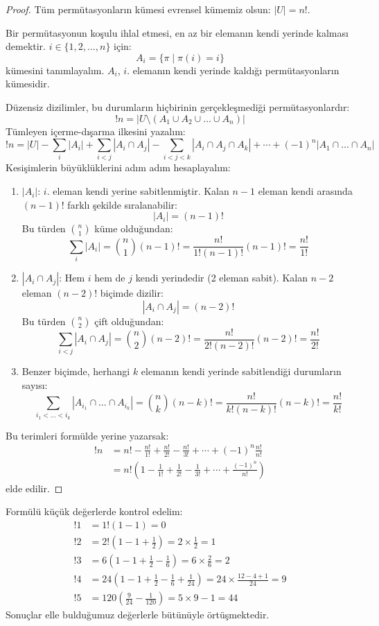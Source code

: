 \begin{proof} Tüm permütasyonların kümesi evrensel kümemiz olsun: $|U| = n!$.

Bir permütasyonun koşulu ihlal etmesi, en az bir elemanın kendi yerinde kalması
demektir. $i \in \{1, 2, \dots, n\}$ için: \[ A_i = \{ \pi \mid \pi(i) = i \} \]
kümesini tanımlayalım. $A_i$, $i$. elemanın kendi yerinde kaldığı permütasyonların
kümesidir.

Düzensiz dizilimler, bu durumların hiçbirinin gerçekleşmediği
permütasyonlardır: \[ !n = |U \setminus (A_1 \cup A_2 \cup \dots \cup A_n)| \]
Tümleyen içerme-dışarma ilkesini yazalım: \[ !n = |U| - \sum_{i} |A_i| + \sum_{i
< j} |A_i \cap A_j| - \sum_{i < j < k} |A_i \cap A_j \cap A_k| + \cdots + (-1)^n
|A_1 \cap \dots \cap A_n| \] Kesişimlerin büyüklüklerini adım adım hesaplayalım:
\begin{enumerate} \item $|A_i|$: $i$. eleman kendi yerine sabitlenmiştir. Kalan
$n-1$ eleman kendi arasında $(n-1)!$ farklı şekilde sıralanabilir: \[ |A_i| =
(n-1)! \] Bu türden $\binom{n}{1}$ küme olduğundan: \[ \sum_{i} |A_i| =
\binom{n}{1} (n-1)! = \frac{n!}{1!(n-1)!} (n-1)! = \frac{n!}{1!} \] \item
$|A_i \cap A_j|$: Hem $i$ hem de $j$ kendi yerindedir (2 eleman sabit). Kalan $n-2$
eleman $(n-2)!$ biçimde dizilir: \[ |A_i \cap A_j| = (n-2)! \] Bu türden
$\binom{n}{2}$ çift olduğundan: \[ \sum_{i < j} |A_i \cap A_j| = \binom{n}{2}
(n-2)! = \frac{n!}{2!(n-2)!} (n-2)! = \frac{n!}{2!} \] \item Benzer biçimde,
herhangi $k$ elemanın kendi yerinde sabitlendiği durumların sayısı: \[ \sum_{i_1 <
\dots < i_k} |A_{i_1} \cap \dots \cap A_{i_k}| = \binom{n}{k} (n-k)! =
\frac{n!}{k!(n-k)!} (n-k)! = \frac{n!}{k!} \] \end{enumerate} Bu terimleri
formülde yerine yazarsak: \begin{align*} !n &= n! - \frac{n!}{1!} +
\frac{n!}{2!} - \frac{n!}{3!} + \cdots + (-1)^n \frac{n!}{n!} \\ &= n! \left( 1 -
\frac{1}{1!} + \frac{1}{2!} - \frac{1}{3!} + \cdots + \frac{(-1)^n}{n!} \right)
\end{align*} elde edilir. \end{proof}

Formülü küçük değerlerde kontrol edelim: \begin{align*} !1 &= 1!(1 - 1) = 0 \\
!2 &= 2!\left(1 - 1 + \frac{1}{2}\right) = 2 \times \frac{1}{2} = 1 \\ !3 &= 6\left(1
- 1 + \frac{1}{2} - \frac{1}{6}\right) = 6 \times \frac{2}{6} = 2 \\ !4 &= 24\left(1
- 1 + \frac{1}{2} - \frac{1}{6} + \frac{1}{24}\right) = 24 \times \frac{12 - 4 +
1}{24} = 9 \\ !5 &= 120\left(\frac{9}{24} - \frac{1}{120}\right) = 5 \times 9 - 1 =
44 \end{align*} Sonuçlar elle bulduğumuz değerlerle bütünüyle örtüşmektedir.

